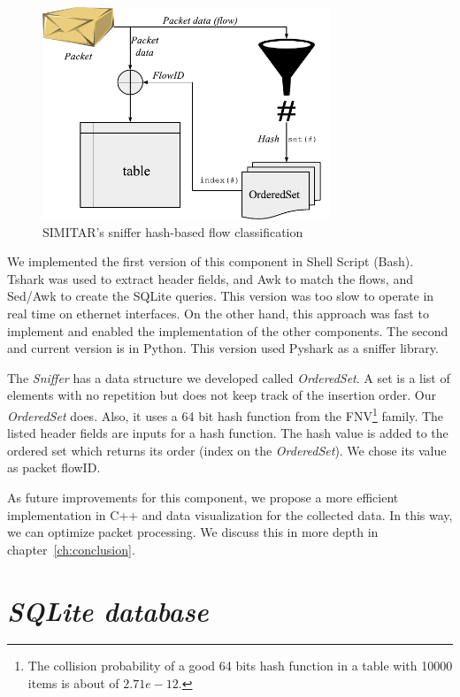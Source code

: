 \begin{figure}[ht!]
        \centering
        \includegraphics[height=2.5in]{figures/ch3/sniffer-classifier}
        \caption{SIMITAR's sniffer hash-based flow classification}
    \label{fig:sniffer}
\end{figure}



We implemented the first version of this component in Shell Script (Bash). Tshark\cite{web-tshark} was used to extract header fields, and Awk to match the flows, and Sed/Awk to create the SQLite queries. This version was too slow to operate in real time on ethernet interfaces. On the other hand, this approach was fast to implement and enabled the implementation of the other components. The second and current version is in Python. This version used Pyshark\cite{web-pyshark} as a sniffer library.

The \textit{Sniffer} has a data structure we developed called \textit{OrderedSet}. A set is a list of elements with no repetition but does not keep track of the insertion order. Our \textit{OrderedSet} does. Also, it uses a 64 bit hash function from the \acrshort{FNV}\footnote{The collision probability of a good 64 bits hash function in a table with 10000 items is about of $2.71e-12$.} family. The listed header fields are inputs for a hash function. The hash value is added to the ordered set which returns its order (index on the \textit{OrderedSet}). We chose its value as packet \acrshort{flowID}.

As future improvements for this component, we propose a more efficient implementation in C++ and data visualization for the collected data. In this way, we can optimize packet processing. We discuss this in more depth in chapter~\ref{ch:conclusion}.

\section{ \textit{SQLite database} }

